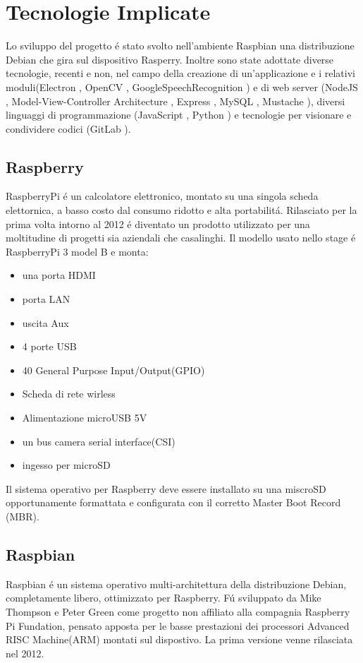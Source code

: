 \chapter{Tecnologie Implicate}

Lo sviluppo del progetto \'e stato svolto nell'ambiente Raspbian\cite{Raspbian}
una distribuzione Debian\cite{Debian} che gira sul dispositivo Rasperry\cite{Raspberry}.
Inoltre sono state adottate diverse tecnologie, recenti
e non, nel campo della creazione di un'applicazione e i relativi moduli(Electron \cite{Electron-website},
OpenCV \cite{OpenCV-website}, GoogleSpeechRecognition \cite{GoogleSTT-website})
e di web server (NodeJS \cite{NodeJS-website},  Model-View-Controller Architecture \cite{MVC-Architecture},
Express \cite{Express-website}, MySQL \cite{MySQL}, Mustache \cite{Mustache}),
diversi linguaggi di programmazione (JavaScript \cite{JavaScript}, Python \cite{Python})
e tecnologie per visionare e condividere codici (GitLab \cite{git-website}).

\section{Raspberry}
RaspberryPi \'e un calcolatore elettronico, montato su una singola scheda elettornica, a basso costo
dal consumo ridotto e alta portabilit\'a.
Rilasciato per la prima volta intorno al 2012 \'e diventato un prodotto utilizzato per una moltitudine
di progetti sia aziendali che casalinghi.
Il modello usato nello stage \'e RaspberryPi 3 model B e monta:
\begin{itemize}
\item una porta HDMI
\item porta LAN
\item uscita Aux
\item 4 porte USB
\item 40 General Purpose Input/Output(GPIO)
\item Scheda di rete wirless
\item Alimentazione microUSB 5V
\item un bus camera serial interface(CSI)
\item ingesso per microSD
\end{itemize}
Il sistema operativo per Raspberry deve essere installato su una miscroSD opportunamente formattata
e configurata con il corretto Master Boot Record (MBR).

\section{Raspbian}
Raspbian \'e un sistema operativo multi-architettura della distribuzione Debian, completamente libero,
ottimizzato per Raspberry.
F\'u sviluppato da Mike Thompson e Peter Green come progetto non affiliato alla compagnia Raspberry Pi
Fundation, pensato apposta per le basse prestazioni dei processori Advanced RISC Machine(ARM) montati sul
dispostivo.
La prima versione venne rilasciata nel 2012.


